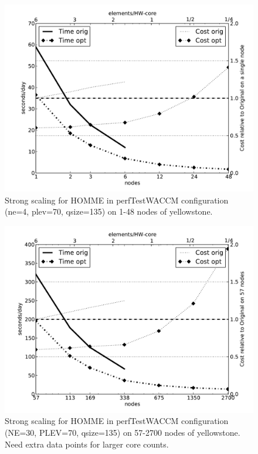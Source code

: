 \begin{figure}[]
 \begin{center}
\includegraphics[width=12.0cm]{figures/homme-ys-ne4-waccm.pdf}
\end{center}
\caption{Strong scaling for HOMME in perfTestWACCM configuration (ne=4, plev=70, qsize=135) on 1-48 nodes of yellowstone.}
\label{fig:homme-ys-ne4}
\end{figure}



\begin{figure}[]
 \begin{center}
\includegraphics[width=12.0cm]{figures/homme-ys-ne30-waccm.pdf}
\end{center}
\caption{Strong scaling for HOMME in perfTestWACCM configuration (NE=30, PLEV=70, qsize=135) on 57-2700 nodes of yellowstone.{\color{red} Need extra data points for larger core counts.}}
\label{fig:homme-ys-ne30}
\end{figure}

